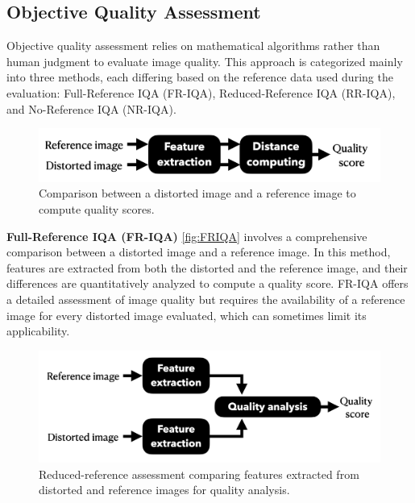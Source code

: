 \subsection{Objective Quality Assessment}
\label{sub:ObjectiveQualityAssessment}
Objective quality assessment relies on mathematical algorithms rather than human judgment to evaluate image quality. This approach is categorized mainly into three methods, each differing based on the reference data used during the evaluation: Full-Reference IQA (FR-IQA), Reduced-Reference IQA (RR-IQA), and No-Reference IQA (NR-IQA). \par
\vspace{\baselineskip}
\begin{figure}[ht]
    \centering
    \includegraphics[keepaspectratio,width=15cm]{img/FRIQA.png}
    \caption{Comparison between a distorted image and a reference image to compute quality scores.}
    \label{fig:FRIQA}
\end{figure}
\textbf{Full-Reference IQA (FR-IQA)} \autoref{fig:FRIQA}  involves a comprehensive comparison between a distorted image and a reference image. In this method, features are extracted from both the distorted and the reference image, and their differences are quantitatively analyzed to compute a quality score. FR-IQA offers a detailed assessment of image quality but requires the availability of a reference image for every distorted image evaluated, which can sometimes limit its applicability. \par
\vspace{\baselineskip}
\begin{figure}[ht]
    \centering
    \includegraphics[keepaspectratio,width=15cm]{img/RRIQA.png}
    \caption{Reduced-reference assessment comparing features extracted from distorted and reference images for quality analysis.}
    \label{fig:RRIQA}
\end{figure}
